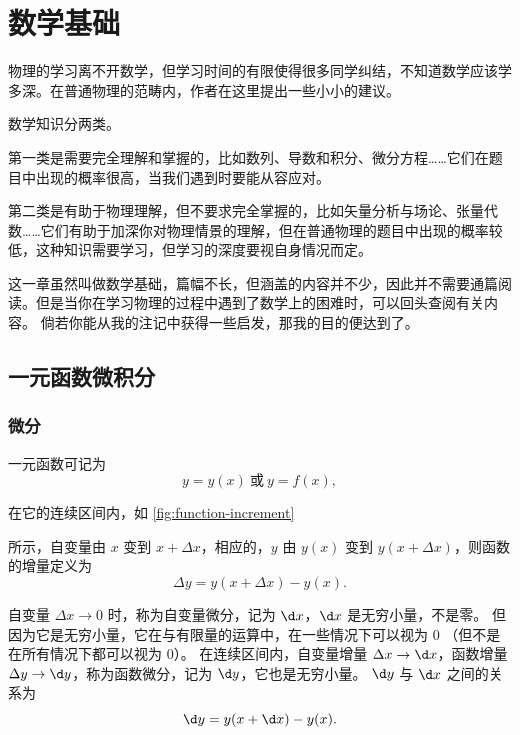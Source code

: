 \chapter{数学基础}\label{chap:math-basics}

\begin{intro}
    物理的学习离不开数学，但学习时间的有限使得很多同学纠结，不知道数学应该学多深。在普通物理的范畴内，作者在这里提出一些小小的建议。

    数学知识分两类。

    第一类是需要完全理解和掌握的，比如数列、导数和积分、微分方程……它们在题目中出现的概率很高，当我们遇到时要能从容应对。

    第二类是有助于物理理解，但不要求完全掌握的，比如矢量分析与场论、张量代数……它们有助于加深你对物理情景的理解，但在普通物理的题目中出现的概率较低，这种知识需要学习，但学习的深度要视自身情况而定。

    这一章虽然叫做数学基础，篇幅不长，但涵盖的内容并不少，因此并不需要通篇阅读。但是当你在学习物理的过程中遇到了数学上的困难时，可以回头查阅有关内容。
    倘若你能从我的注记中获得一些启发，那我的目的便达到了。
\end{intro}

\section{一元函数微积分}\label{sec:single-variable-calculus}

\subsection{微分}\label{subsec:differential}

一元函数可记为
\begin{equation*}
    y = y(x)\ \text{或}\ y = f(x),
\end{equation*}

在它的连续区间内，如 \cref{fig:function-increment}


所示，自变量由 $x$ 变到 $x + \Delta x$，相应的，$y$ 由 $y(x)$ 变到 $y(x + \Delta x)$，则函数的增量定义为
\begin{equation*}
    \Delta y = y(x + \Delta x) - y(x).
\end{equation*}

自变量 $ \Delta x \to 0$ 时，称为自变量微分，记为 $ \d x$，$ \d x$ 是无穷小量，不是零。
但因为它是无穷小量，它在与有限量的运算中，在一些情况下可以视为 0 （但不是在所有情况下都可以视为 0）。
在连续区间内，自变量增量 $\Delta x \to \d x$，函数增量 $\Delta y \to \d y$，称为函数微分，记为 $\d y$，它也是无穷小量。
$ \d y $ 与 $ \d x $ 之间的关系为
\begin{equation*}
    \d y = y (x + \d x) - y (x).
\end{equation*}

